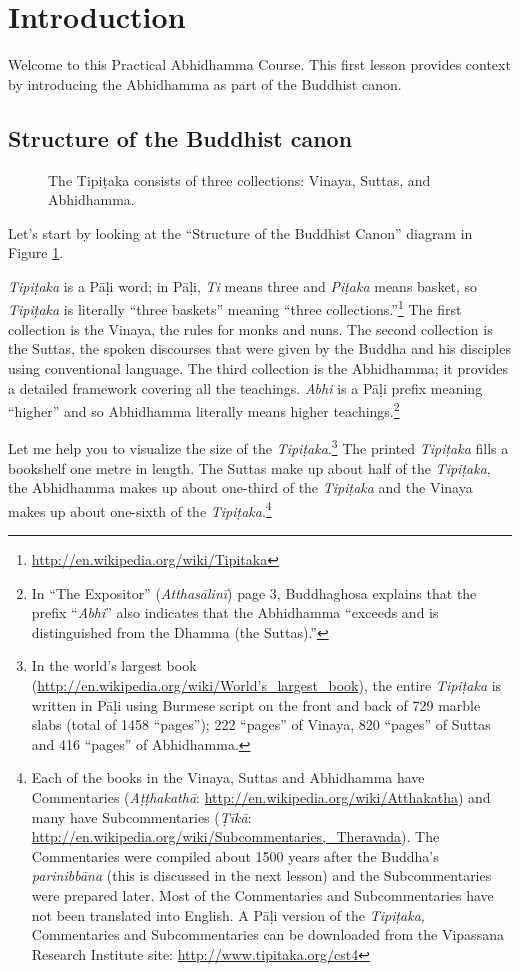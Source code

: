 \section{Introduction}

Welcome to this Practical Abhidhamma Course. This first lesson provides context by introducing the Abhidhamma as part of the Buddhist canon.

\subsection*{Structure of the Buddhist canon}

\begin{figure}[H]
\centering

\caption{The Tipiṭaka consists of three collections: Vinaya, Suttas, and Abhidhamma.}
\label{fig:Tipitaka}
\end{figure}

Let’s start by looking at the “Structure of the Buddhist Canon” diagram in Figure \ref{fig:Tipitaka}.

\textit{Tipiṭaka} is a Pāḷi word; in Pāḷi, \textit{Ti} means three and \textit{Piṭaka} means basket, so \textit{Tipiṭaka} is literally “three baskets” meaning “three collections.”\footnote{\url{http://en.wikipedia.org/wiki/Tipitaka}} The first collection is the Vinaya, the rules for monks and nuns. The second collection is the Suttas, the spoken discourses that were given by the Buddha and his disciples using conventional language. The third collection is the Abhidhamma; it provides a detailed framework covering all the teachings. \textit{Abhi} is a Pāḷi prefix meaning “higher” and so Abhidhamma literally means higher teachings.\footnote{In “The Expositor” (\textit{Atthasālinī}) page 3, Buddhaghosa explains that the prefix “\textit{Abhi}” also indicates that the Abhidhamma “exceeds and is distinguished from the Dhamma (the Suttas).”}

Let me help you to visualize the size of the \textit{Tipiṭaka}.\footnote{In the world’s largest book (\url{http://en.wikipedia.org/wiki/World’s_largest_book}), the entire \textit{Tipiṭaka} is written in Pāḷi using Burmese script on the front and back of 729 marble slabs (total of 1458 “pages”); 222 “pages” of Vinaya, 820 “pages” of Suttas and 416 “pages” of Abhidhamma.} The printed \textit{Tipiṭaka} fills a bookshelf one metre in length. The Suttas make up about half of the \textit{Tipiṭaka}, the Abhidhamma makes up about one-third of the \textit{Tipiṭaka} and the Vinaya makes up about one-sixth of the \textit{Tipiṭaka}.\footnote{Each of the books in the Vinaya, Suttas and Abhidhamma have Commentaries (\textit{Aṭṭhakathā}: \url{http://en.wikipedia.org/wiki/Atthakatha}) and many have Subcommentaries (\textit{Ṭīkā}: \url{http://en.wikipedia.org/wiki/Subcommentaries,_Theravada}). The Commentaries were compiled about 1500 years after the Buddha's \textit{parinibbāna} (this is discussed in the next lesson) and the Subcommentaries were prepared later. Most of the Commentaries and Subcommentaries have not been translated into English. A Pāḷi version of the \textit{Tipiṭaka}, Commentaries and Subcommentaries can be downloaded from the Vipassana Research Institute site: \url{http://www.tipitaka.org/cst4}}

